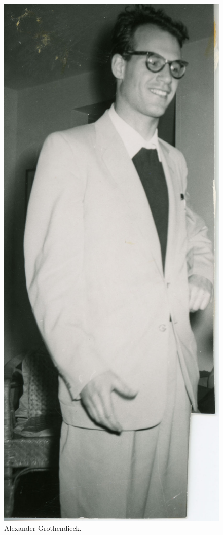 \documentclass [11 pt, oneside] {article}
\begin{document}
\begin{figure}
	\begin{center}
		\includegraphics [scale = 1] {images/grothendieck}
		\caption {Alexander Grothendieck.}
	\end{center}
\end{figure}
\end{document}
